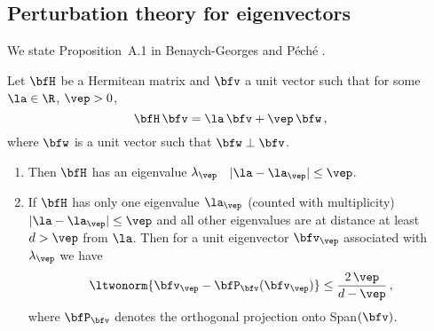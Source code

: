 \subsection{Perturbation theory for eigenvectors}
We state Proposition~A.1 in Benaych-Georges and P\'{e}ch\'{e} \cite{benaych:peche}.
\begin{proposition}\label{prop:perturbation}
Let $\bfH$ be a Hermitean matrix and $\bfv$ a unit vector such that for some  $\la\in \R$, $\vep>0$,
\begin{equation*}
\bfH\,\bfv= \la\,\bfv + \vep\, \bfw\,,
\end{equation*}
where $\bfw$ is a unit vector such that $\bfw \perp \bfv$.
\begin{enumerate}
\item
Then $\bfH$ has an eigenvalue $\lambda_{\vep}$ \sth\ $|\la-\la_\vep|\le \vep$.
\item
If $\bfH$ has only one eigenvalue $\la_\vep$ (counted with multiplicity) \sth\ $|\la-\la_\vep|\le \vep$ and all other eigenvalues 
are at distance at least $d>\vep$ from $\la$. Then for a unit eigenvector $\bfv_\vep$ associated with $\lambda_{\vep}$ we have
\begin{equation*}
\ltwonorm{\bfv_{\vep} - \bfP_\bfv(\bfv_{\vep})} \le \frac{2\, \vep}{d-\vep}\,,
\end{equation*}
where $\bfP_{\bfv}$ denotes the orthogonal projection onto \rm{Span}$(\bfv)$.
\end{enumerate}
\end{proposition}





